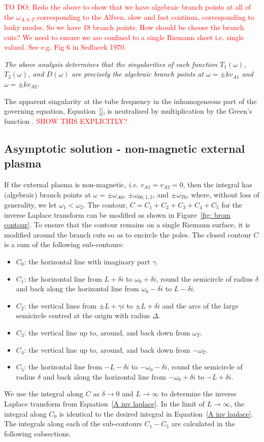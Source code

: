 \documentclass[12pt, draft]{../style-files/ociamthesis}
\begin{document}
\textcolor{red}{TO DO: Redo the above to show that we have algebraic branch points at all of the $\omega_{A,0,T}$ corresponding to the Alfven, slow and fast continua, corresponding to leaky modes. So we have 18 branch points. How should be choose the branch cuts? We need to ensure we are confined to a single Riemann sheet i.e. single valued. See e.g. Fig 6 in Sedlacek 1970.}

\textit{The above analysis determines that the singularities of each function $T_1(\omega)$, $T_2(\omega)$, and $D(\omega)$ are precisely the algebraic branch points at $\omega = \pm kv_{A1}$ and $\omega = \pm kv_{A2}$.}

The apparent singularity at the tube frequency in the inhomogeneous part of the governing equation, Equation~\eqref{}, is neutralised by multiplication by the Green's function \citep{and_etal07}. \textcolor{red}{SHOW THIS EXPLICITLY?}

\subsection{Asymptotic solution - non-magnetic external plasma}
If the external plasma is non-magnetic, \textit{i.e.} $v_{A1} = v_{A2} = 0$, then the integral has (algebraic) branch points at $\omega = \pm \omega_{A0}$, $\pm \omega_{00,1,2}$, and $\pm \omega_{T0}$, where, without loss of generality, we let $\omega_1 < \omega_2$. The contour, $C = C_1 + C_2 + C_3 + C_4 + C_5$ for the inverse Laplace transform can be modified as shown in Figure~\ref{fig: brom contour}. To ensure that the contour remains on a single Riemann surface, it is modified around the branch cuts so as to encircle the poles. The closed contour $C$ is a sum of the following sub-contours:
\begin{itemize}
	\item $C_0$: the horizontal line with imaginary part $\gamma$.
	\item $C_1$: the horizontal line from $L + \delta i$ to $\omega_0 + \delta i$, round the semicircle of radius $\delta$ and back along the horizontal line from $\omega_0 - \delta i$ to $L - \delta i$.
	\item $C_2$: the vertical lines from $\pm L + \gamma i$ to $\pm L + \delta i$ and the arcs of the large semicircle centred at the origin with radius $\Delta$.
	\item $C_3$: the vertical line up to, around, and back down from $\omega_T$.
	\item $C_4$: the vertical line up to, around, and back down from $-\omega_T$.
	\item $C_5$: the horizontal line from $-L - \delta i$ to $-\omega_0 - \delta i$, round the semicircle of radius $\delta$ and back along the horizontal line from $-\omega_0 + \delta i$ to $-L + \delta i$.
\end{itemize}
We use the integral along $C$ as $\delta \to 0$ and $L \to \infty$ to determine the inverse Laplace transform from Equation~\eqref{A inv laplace}. In the limit of $L \to \infty$, the integral along $C_0$ is identical to the desired integral in Equation~\eqref{A inv laplace}. The integrals along each of the sub-contours $C_1 - C_5$ are calculated in the following subsections.
\end{document}
